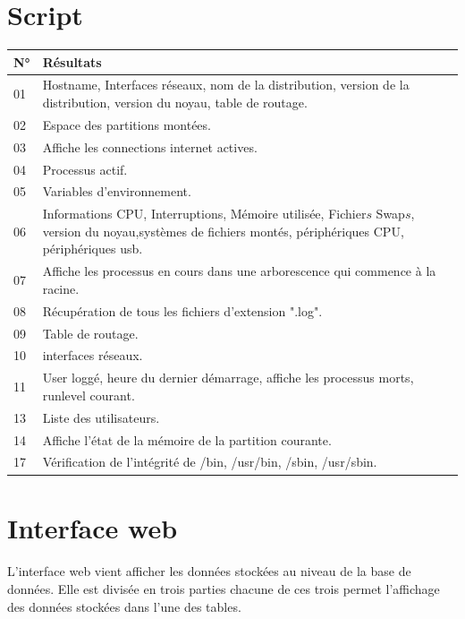 \documentclass[11pt,a4paper,titlepage, oneside]{article}
\begin{document}
\section{{\color{red} Script }}
		\begin{tabular}{|l|p{12cm}|}
			\hline
				\textbf{N°}&\textbf{Résultats}\\
			\hline
				01 & Hostname, Interfaces réseaux, nom de la distribution, version de la distribution, version du noyau, table de routage.\\
			\hline
				02 & Espace des partitions montées.\\
			\hline
				03 & Affiche les connections internet actives.\\
			\hline
				04 & Processus actif.\\
			\hline
				05 & Variables d'environnement.\\
			\hline
				06 & Informations CPU, Interruptions, Mémoire utilisée, Fichier\(s\) Swap\(s\), version du noyau,systèmes de fichiers montés, périphériques CPU, périphériques usb.\\
			\hline
				07 & Affiche les processus en cours dans une arborescence qui commence à la racine.\\
			\hline
				08 & Récupération de tous les fichiers d'extension ".log".\\
			\hline
				09 & Table de routage.\\
			\hline
				10 & interfaces réseaux.\\
			\hline
				11 & User loggé, heure du dernier démarrage, affiche les processus morts, runlevel courant.\\
			\hline
				13 & Liste des utilisateurs.\\
			\hline
				14 & Affiche l'état de la mémoire de la partition courante.\\
			\hline
				17 & Vérification de l'intégrité de /bin, /usr/bin, /sbin, /usr/sbin.\\
			\hline
		\end{tabular}
		
\newpage
\section{{\color{red} Interface web}}
\paragraph{}
L'interface web vient afficher les données stockées au niveau de la base de données. Elle est divisée en trois parties chacune de ces trois permet l'affichage des données stockées dans l'une des tables.
\end{document}
